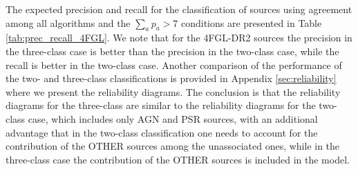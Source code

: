 \documentclass[referee]{aa} %
\begin{document}
The expected precision and recall for the classification of sources using agreement among all algorithms and the
$\sum_a p_a > 7$ conditions are presented in Table \ref{tab:prec_recall_4FGL}.
We note that for the 4FGL-DR2 sources the
precision in the three-class case is better than the precision in the two-class case, while the recall is better in the two-class case.
Another comparison of the performance of the two- and three-class classifications is provided in Appendix \ref{sec:reliability} where we present the reliability diagrams.
The conclusion is that the reliability diagrams for the three-class are similar to the reliability diagrams for the two-class case, which includes only AGN and PSR sources, with an additional advantage that in the two-class classification one needs to account for the contribution of the OTHER sources among the unassociated ones, while in the three-class case the contribution of the OTHER sources is included in the model.

\begin{table}[!h]
    \caption{Testing accuracy of the four selected algorithms for the three-class classification of 4FGL-DR2 sources.}
    \label{tab:selected_algs_4fgl_multi}

\centering
\hspace{-0.2cm}
\end{table}
\end{document}
